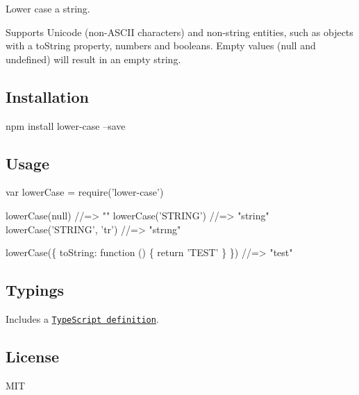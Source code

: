 \href{https://npmjs.org/package/lower-case}{\tt } \href{https://npmjs.org/package/lower-case}{\tt } \href{https://travis-ci.org/blakeembrey/lower-case}{\tt } \href{https://coveralls.io/r/blakeembrey/lower-case?branch=master}{\tt }

Lower case a string.

Supports Unicode (non-\/\+A\+S\+C\+II characters) and non-\/string entities, such as objects with a {\ttfamily to\+String} property, numbers and booleans. Empty values ({\ttfamily null} and {\ttfamily undefined}) will result in an empty string.

\subsection*{Installation}


\begin{DoxyCode}
npm install lower-case --save
\end{DoxyCode}


\subsection*{Usage}


\begin{DoxyCode}
var lowerCase = require('lower-case')

lowerCase(null)           //=> ""
lowerCase('STRING')       //=> "string"
lowerCase('STRING', 'tr') //=> "strıng"

lowerCase(\{ toString: function () \{ return 'TEST' \} \}) //=> "test"
\end{DoxyCode}


\subsection*{Typings}

Includes a \href{lower-case.d.ts}{\tt Type\+Script definition}.

\subsection*{License}

M\+IT 